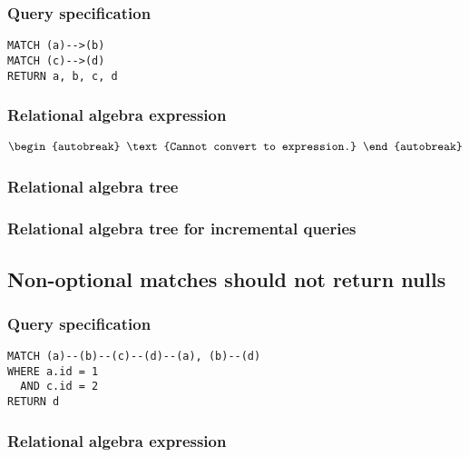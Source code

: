 \subsubsection*{Query specification}

\begin{lstlisting}
MATCH (a)-->(b)
MATCH (c)-->(d)
RETURN a, b, c, d
\end{lstlisting}

\subsubsection*{Relational algebra expression}

\begin{align*}
\begin{autobreak}
\text{Cannot convert to expression.}
\end{autobreak}
\end{align*}

\subsubsection*{Relational algebra tree}


\subsubsection*{Relational algebra tree for incremental queries}


\subsection{Non-optional matches should not return nulls}

\subsubsection*{Query specification}

\begin{lstlisting}
MATCH (a)--(b)--(c)--(d)--(a), (b)--(d)
WHERE a.id = 1
  AND c.id = 2
RETURN d
\end{lstlisting}

\subsubsection*{Relational algebra expression}

